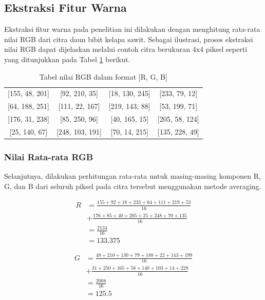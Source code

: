 \subsection{Ekstraksi Fitur Warna} \label{III.Ekstraksi Fitur Warna}
Ekstraksi fitur warna pada penelitian ini dilakukan dengan menghitung rata-rata nilai RGB dari citra daun bibit kelapa sawit. Sebagai ilustrasi, proses ekstraksi nilai RGB dapat dijelaskan melalui contoh citra berukuran 4x4 piksel seperti yang ditunjukkan pada Tabel \ref{tab:tabel-rgb} berikut.
\begin{table}[H]
    \centering
    \begin{tabular}{|c|c|c|c|}
        \hline
        {[}155, 48, 201{]} & {[}92, 210, 35{]} & {[}18, 130, 245{]} & {[}233, 79, 12{]} \\
        {[}64, 188, 251{]} & {[}111, 22, 167{]} & {[}219, 143, 88{]} & {[}53, 199, 71{]} \\
        {[}176, 31, 238{]} & {[}85, 250, 96{]} & {[}40, 165, 15{]} & {[}205, 58, 124{]} \\
        {[}25, 140, 67{]} & {[}248, 103, 191{]} & {[}70, 14, 215{]} & {[}135, 228, 49{]} \\
        \hline
    \end{tabular}
    \caption{Tabel nilai RGB dalam format [R, G, B]}
    \label{tab:tabel-rgb}
\end{table}

\subsubsection{Nilai Rata-rata RGB} \label{III.Nilai Rata-rata RGB}
Selanjutnya, dilakukan perhitungan rata-rata untuk masing-masing komponen R, G, dan B dari seluruh piksel pada citra tersebut menggunakan metode averaging.

\begin{equation*}
\begin{split}
R &= \frac{155 + 92 + 18 + 233 + 64 + 111 + 219 + 53}{16} \\
  &+ \frac{176 + 85 + 40 + 205 + 25 + 248 + 70 + 135}{16} \\
  &= \frac{2134}{16} \\
  &= 133.375
\end{split}
\end{equation*}

\begin{equation*}
\begin{split}
G &= \frac{48 + 210 + 130 + 79 + 188 + 22 + 143 + 199}{16} \\
  &+ \frac{31 + 250 + 165 + 58 + 140 + 103 + 14 + 228}{16} \\
  &= \frac{2008}{16} \\
  &= 125.5
\end{split}
\end{equation*}

